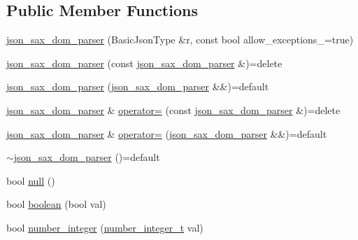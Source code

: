 \subsection*{Public Member Functions}
\begin{DoxyCompactItemize}
\item 
\mbox{\hyperlink{classnlohmann_1_1detail_1_1json__sax__dom__parser_afc50fee0a92ce84afb84041ebbdfba80}{json\+\_\+sax\+\_\+dom\+\_\+parser}} (Basic\+Json\+Type \&r, const bool allow\+\_\+exceptions\+\_\+=true)
\item 
\mbox{\hyperlink{classnlohmann_1_1detail_1_1json__sax__dom__parser_a0a00cd158d678e294f6e974cd9373c4b}{json\+\_\+sax\+\_\+dom\+\_\+parser}} (const \mbox{\hyperlink{classnlohmann_1_1detail_1_1json__sax__dom__parser}{json\+\_\+sax\+\_\+dom\+\_\+parser}} \&)=delete
\item 
\mbox{\hyperlink{classnlohmann_1_1detail_1_1json__sax__dom__parser_ad6e588652d5a9cb647a3c32a6221f13e}{json\+\_\+sax\+\_\+dom\+\_\+parser}} (\mbox{\hyperlink{classnlohmann_1_1detail_1_1json__sax__dom__parser}{json\+\_\+sax\+\_\+dom\+\_\+parser}} \&\&)=default
\item 
\mbox{\hyperlink{classnlohmann_1_1detail_1_1json__sax__dom__parser}{json\+\_\+sax\+\_\+dom\+\_\+parser}} \& \mbox{\hyperlink{classnlohmann_1_1detail_1_1json__sax__dom__parser_a98448bf2cbc15d15e2eddc5a09a40a42}{operator=}} (const \mbox{\hyperlink{classnlohmann_1_1detail_1_1json__sax__dom__parser}{json\+\_\+sax\+\_\+dom\+\_\+parser}} \&)=delete
\item 
\mbox{\hyperlink{classnlohmann_1_1detail_1_1json__sax__dom__parser}{json\+\_\+sax\+\_\+dom\+\_\+parser}} \& \mbox{\hyperlink{classnlohmann_1_1detail_1_1json__sax__dom__parser_aff928a07e40e4efb16b3ff9384f4401c}{operator=}} (\mbox{\hyperlink{classnlohmann_1_1detail_1_1json__sax__dom__parser}{json\+\_\+sax\+\_\+dom\+\_\+parser}} \&\&)=default
\item 
\mbox{\hyperlink{classnlohmann_1_1detail_1_1json__sax__dom__parser_a4b93deb5c1d716dcfb33b3ed8a00ac4d}{$\sim$json\+\_\+sax\+\_\+dom\+\_\+parser}} ()=default
\item 
bool \mbox{\hyperlink{classnlohmann_1_1detail_1_1json__sax__dom__parser_abb06babaa861f123d8d0cb443b887d8a}{null}} ()
\item 
bool \mbox{\hyperlink{classnlohmann_1_1detail_1_1json__sax__dom__parser_a476c4634b93546a1a555725e551c2b33}{boolean}} (bool val)
\item 
bool \mbox{\hyperlink{classnlohmann_1_1detail_1_1json__sax__dom__parser_aff77f861ba336df48c9786a993941397}{number\+\_\+integer}} (\mbox{\hyperlink{classnlohmann_1_1detail_1_1json__sax__dom__parser_a3d5cd67d179aa7422ce90e54984a441e}{number\+\_\+integer\+\_\+t}} val)

\end{DoxyCompactItemize}
